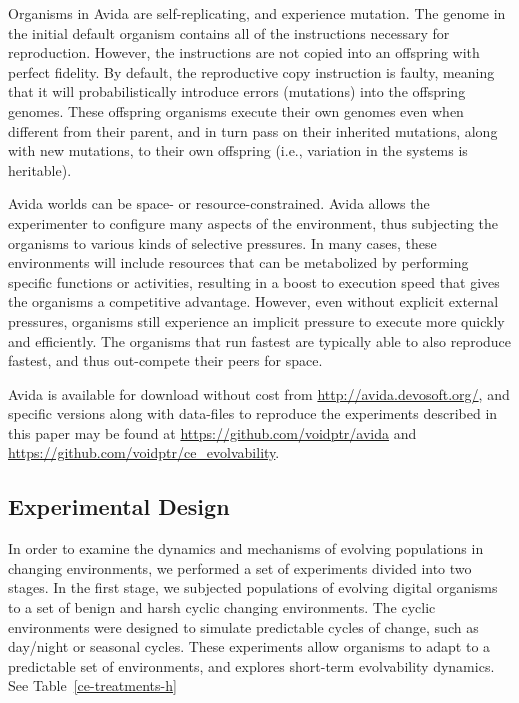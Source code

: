 \documentclass[10pt,letterpaper]{article}
\begin{document}
Organisms in Avida are self-replicating, and experience mutation. The genome in the initial default organism contains all of the instructions necessary for reproduction. However, the instructions are not copied into an offspring with perfect fidelity. By default, the reproductive copy instruction is faulty, meaning that it will probabilistically introduce errors (mutations) into the offspring genomes. These offspring organisms execute their own genomes even when different from their parent, and in turn pass on their inherited mutations, along with new mutations, to their own offspring (i.e., variation in the systems is heritable).

Avida worlds can be space- or resource-constrained. Avida allows the experimenter to configure many aspects of the environment, thus subjecting the organisms to various kinds of selective pressures.  In many cases, these environments will include resources that can be metabolized by performing specific functions or activities, resulting in a boost to execution speed that gives the organisms a competitive advantage. However, even without explicit external pressures, organisms still experience an implicit pressure to execute more quickly and efficiently. The organisms that run fastest are typically able to also reproduce fastest, and thus out-compete their peers for space.

Avida is available for download without cost from \url{http://avida.devosoft.org/}, and specific versions along with data-files to reproduce the experiments described in this paper may be found at \url{https://github.com/voidptr/avida} and \url{https://github.com/voidptr/ce_evolvability}.

\subsection*{Experimental Design}
In order to examine the dynamics and mechanisms of evolving populations in changing environments, we performed a set of experiments divided into two stages. In the first stage, we subjected populations of evolving digital organisms to a set of benign and harsh cyclic changing environments. The cyclic environments were designed to simulate predictable cycles of change, such as day/night or seasonal cycles. These experiments allow organisms to adapt to a predictable set of environments, and explores short-term evolvability dynamics. See Table~\ref{ce-treatments-h}
\end{document}
